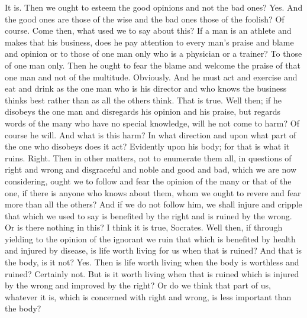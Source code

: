 \documentclass[letterpaper,12pt]{article}
\begin{document}
\begin{drama}
\critospeaks 
It is.
\socratesspeaks 
Then we ought to esteem the good opinions and not the bad ones?
\critospeaks 
Yes.
\socratesspeaks 
And the good ones are those of the wise and the bad ones those of the foolish?
\critospeaks 
Of course.
\socratesspeaks 
Come then, what used we to say about this?  If a man is an athlete and makes that his business, does he pay attention to every man's praise and blame and opinion or to those of one man only who is a physician or a trainer?
\critospeaks 
To those of one man only.
\socratesspeaks 
Then he ought to fear the blame and welcome the praise of that one man and not of the multitude.
\critospeaks 
Obviously.
\socratesspeaks 
And he must act and exercise and eat and drink as the one man who is his director and who knows the business thinks best rather than as all the others think.
\critospeaks 
That is true. 
\socratesspeaks 
Well then; if he disobeys the one man and disregards his opinion and his praise, but regards words of the many who have no special knowledge, will he not come to harm?
\critospeaks 
Of course he will.
\socratesspeaks 
And what is this harm? In what direction and upon what part of the one who disobeys does it act?
\critospeaks 
Evidently upon his body; for that is what it ruins.
\socratesspeaks 
Right. Then in other matters, not to enumerate them all, in questions of right and wrong and disgraceful and noble and good and bad, which we are now considering, ought we to follow and fear  the opinion of the many or that of the one, if there is anyone who knows about them, whom we ought to revere and fear more than all the others? And if we do not follow him, we shall injure and cripple that which we used to say is benefited by the right and is ruined by the wrong. Or is there nothing in this?
\critospeaks 
I think it is true, Socrates.
\socratesspeaks 
Well then, if through yielding to the opinion of the ignorant we ruin that which is benefited by health and injured by disease,  is life worth living for us when that is ruined? And that is the body, is it not?
\critospeaks 
Yes.
\socratesspeaks 
Then is life worth living when the body is worthless and ruined?
\critospeaks 
Certainly not.
\socratesspeaks 
But is it worth living when that is ruined which is injured by the wrong and improved by the right? Or do we think that part of us, whatever it is, which is concerned with right and wrong,  is less important than the body?

\end{drama}
\end{document}
